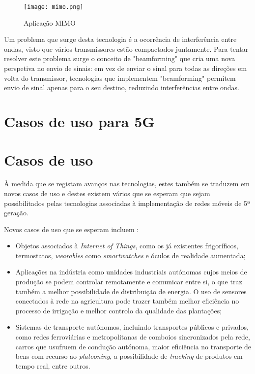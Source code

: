 \documentclass{llncs}
\begin{document}
\begin{figure}
    \centering
    \texttt{[image: mimo.png]}
    \caption{Aplicação MIMO \cite{MIMO}}
\end{figure}

\hspace*{1.5em} Um problema que surge desta tecnologia é a ocorrência de interferência entre ondas, visto que vários transmissores estão compactados juntamente. Para tentar resolver este problema surge o conceito de "beamforming" que cria uma nova perspetiva no envio de sinais: em vez de enviar o sinal para todas as direções em volta do transmissor, tecnologias que implementem "beamforming" permitem envio de sinal apenas para o seu destino, reduzindo interferências entre ondas.
\section{Casos de uso para 5G}

\section{Casos de uso}

À medida que se registam avanços nas tecnologias, estes também se traduzem em novos casos de uso e destes existem vários que se esperam que sejam possibilitados pelas tecnologias associadas à implementação de redes móveis de 5ª geração.

Novos casos de uso que se esperam incluem :
\begin{itemize}
	\item Objetos associados à \textit{Internet of Things}, como os já existentes frigoríficos, termostatos, \textit{wearables} como \textit{smartwatches} e óculos de realidade aumentada;
	\item Aplicações na indústria como unidades industriais autónomas cujos meios de produção se podem controlar remotamente e comunicar entre si, o que traz também a melhor possibilidade de distribuição de energia. O uso de sensores conectados à rede na agricultura pode trazer também melhor eficiência no processo de irrigação e melhor controlo da qualidade das plantações;
	\item Sistemas de transporte autónomos, incluindo transportes públicos e privados, como redes ferroviárias e metropolitanas de comboios sincronizados pela rede, carros que usufruem de condução autónoma, maior eficiência no transporte de bens com recurso ao \textit{platooning}, a possibilidade de \textit{tracking} de produtos em tempo real, entre outros.
\end{itemize}
\end{document}
